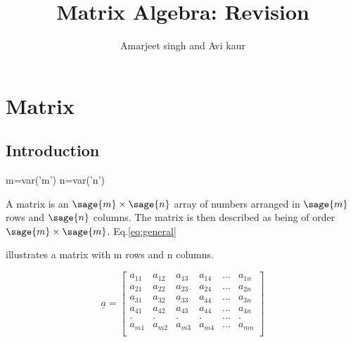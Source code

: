 \documentclass[12pt]{report}
\title{Matrix Algebra: Revision}
\author{Amarjeet singh and Avi kaur}
\newcommand{\eref}[1]{
	Eq.\ref{#1}
}
\begin{document}
\thispagestyle{plain}
	\begin{titlepage}
\maketitle
	\end{titlepage}
	\chapter{Matrix}
	\section{Introduction}
	\begin{sagesilent}
		m=var('m')
		n=var('n')
	\end{sagesilent}

A matrix is an $\sage{m} \times \sage{n}$ 
array of numbers arranged in $\sage{m}$ rows and $\sage{n}$ columns.
The matrix is then described as being of order 
$\sage{m} \times \sage{m}$. \eref{eq:general} 
illustrates a matrix with m rows and n columns.


\begin{equation}
	\underline{a}=\left[\begin{array}{rrrrrr}
		a_{11} & a_{12} & a_{13} & a_{14} & ... & a_{1n} \\
		a_{21} & a_{22} & a_{23} & a_{24} & ... & a_{2n} \\
		a_{31} & a_{32} & a_{33} & a_{44} & ... & a_{3n} \\
		a_{41} & a_{42} & a_{43} & a_{44} & ... & a_{4n} \\
		.     & .     & .     & .     & ... & .     \\
		a_{m1} & a_{m2} & a_{m3} & a_{m4} & ... & a_{mn} \\
	\end{array}\right] \label{eq:general}          
\end{equation}
\end{document}
